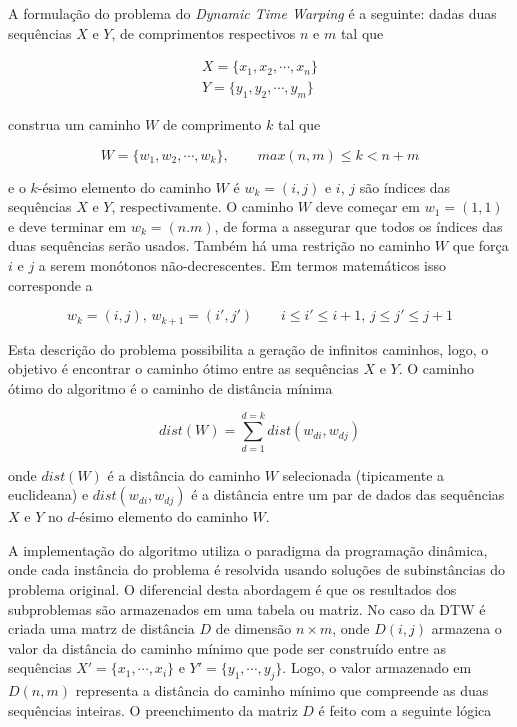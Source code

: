 A formulação do problema \citep{salvador2007toward} do \textit{Dynamic Time Warping} é a seguinte: dadas duas sequências $X$ e $Y$, de comprimentos respectivos $n$ e $m$ tal que 

\begin{align*}
    X = \{x_1, x_2, \cdots, x_n\} \\
    Y = \{y_1, y_2, \cdots, y_m\}
\end{align*}

construa um caminho $W$ de comprimento $k$ tal que

\begin{equation*}
    W = \{w_1, w_2, \cdots, w_k\}, \qquad max(n, m) \leq k < n + m
\end{equation*}

e o $k$-ésimo elemento do caminho $W$ é $w_k = (i, j)$ e $i$, $j$ são índices das sequências $X$ e $Y$, respectivamente. O caminho $W$ deve começar em $w_1 = (1, 1)$ e deve terminar em $w_k = (n. m)$, de forma a assegurar que todos os índices das duas sequências serão usados. Também há uma restrição no caminho $W$ que força $i$ e $j$ a serem monótonos não-decrescentes. Em termos matemáticos isso corresponde a

\begin{equation*}
    w_k = (i, j),\, w_{k + 1} = (i', j') \qquad i \leq i' \leq i + 1,\, j\leq j' \leq j + 1
\end{equation*}

Esta descrição do problema possibilita a geração de infinitos caminhos, logo, o objetivo é encontrar o caminho ótimo entre as sequências $X$ e $Y$. O caminho ótimo do algoritmo é o caminho de distância mínima

\begin{equation*}
    dist(W) = \sum_{d=1}^{d=k} dist(w_{di}, w_{dj})
\end{equation*}

onde $dist(W)$ é a distância do caminho $W$ selecionada (tipicamente a euclideana) e $dist(w_{di}, w_{dj})$ é a distância entre um par de dados das sequências $X$ e $Y$ no $d$-ésimo elemento do caminho $W$.

A implementação do algoritmo utiliza o paradigma da programação dinâmica, onde cada instância do problema é resolvida usando soluções de subinstâncias do problema original. O diferencial desta abordagem é que os resultados dos subproblemas são armazenados em uma tabela ou matriz. No caso da DTW é criada uma matrz de distância $D$ de dimensão $n \times m$, onde $D(i, j)$ armazena o valor da distância do caminho mínimo que pode ser construído entre as sequências $X' = \{x_1, \cdots, x_i\}$ e $Y' = \{y_1, \cdots, y_j\}$. Logo, o valor armazenado em $D(n, m)$ representa a distância do caminho mínimo que compreende as duas sequências inteiras. O preenchimento da matriz $D$ é feito com a seguinte lógica

